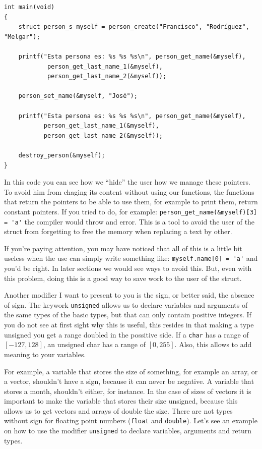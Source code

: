\documentclass[a4paper]{article}
\begin{document}
\noindent
\begin{minipage}[H]{\linewidth}
\mbox{}
\begin{lstlisting}[style=C,
caption={Struct with const pointers -- \texttt{main} function},
label={lst:structConstMain}]
int main(void)
{
    struct person_s myself = person_create("Francisco", "Rodríguez", "Melgar");

    printf("Esta persona es: %s %s %s\n", person_get_name(&myself),
            person_get_last_name_1(&myself),
            person_get_last_name_2(&myself));

    person_set_name(&myself, "José");

    printf("Esta persona es: %s %s %s\n", person_get_name(&myself),
           person_get_last_name_1(&myself),
           person_get_last_name_2(&myself));

    destroy_person(&myself);
}
\end{lstlisting}
\end{minipage}

In this code you can see how we ``hide'' the user how we manage these pointers.
To avoid him from chaging its content without using our functions, the functions
that return the pointers to be able to use them, for example to print them,
return constant pointers. If you tried to do, for example:
\lstinline[style=C]!person_get_name(&myself)[3] = 'a'! the compiler would throw
and error. This is a tool to avoid the user of the struct from forgetting to
free the memory when replacing a text by other.

If you're paying attention, you may have noticed that all of this is a little
bit useless when the use can simply write something like:
\verb!myself.name[0] = 'a'! and you'd be right. In later sections we would see
ways to avoid this. But, even with this problem, doing this is a good way to
save work to the user of the struct.

Another modifier I want to present to you is the sign, or better said, the
absence of sign. The keywork \lstinline[style=C]!unsigned! allows us to
declare variables and arguments of the same types of the basic types, but that
can only contain positive integers. If you do not see at first sight why this is
useful, this resides in that making a type unsigned you get a range doubled in
the possitive side. If a \verb"char" has a range of $[-127, 128]$, an unsigned
char has a range of $[0, 255]$. Also, this allows to add meaning to your
variables.

For example, a variable that stores the size of something, for example an array,
or a vector, shouldn't have a sign, because it can never be negative. A variable
that stores a month, shouldn't either, for instance. In the case of sizes of
vectors it is important to make the variable that stores their size unsigned,
because this allows us to get vectors and arrays of double the size. There are
not types without sign for floating point numbers (\verb!float! and
\verb"double"). Let's see an example on how to use the modifier \verb!unsigned!
to declare variables, arguments and return types.
\end{document}
